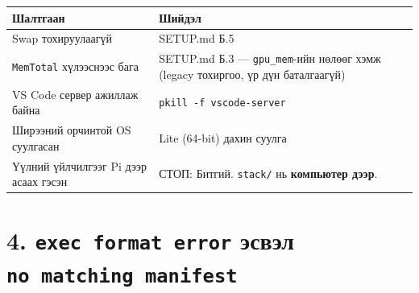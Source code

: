 \begingroup\scriptsize\begin{longtable}[]{@{}ll@{}}
\toprule
\begin{minipage}[b]{0.47\columnwidth}\raggedright
Шалтгаан\strut
\end{minipage} & \begin{minipage}[b]{0.47\columnwidth}\raggedright
Шийдэл\strut
\end{minipage}\tabularnewline
\midrule
\endhead
\begin{minipage}[t]{0.47\columnwidth}\raggedright
Swap тохируулаагүй\strut
\end{minipage} & \begin{minipage}[t]{0.47\columnwidth}\raggedright
SETUP.md Б.5\strut
\end{minipage}\tabularnewline
\begin{minipage}[t]{0.47\columnwidth}\raggedright
\texttt{MemTotal} хүлээснээс бага\strut
\end{minipage} & \begin{minipage}[t]{0.47\columnwidth}\raggedright
SETUP.md Б.3 --- \texttt{gpu\_mem}-ийн нөлөөг хэмж (legacy тохиргоо, үр дүн баталгаагүй)\strut
\end{minipage}\tabularnewline
\begin{minipage}[t]{0.47\columnwidth}\raggedright
VS Code сервер ажиллаж байна\strut
\end{minipage} & \begin{minipage}[t]{0.47\columnwidth}\raggedright
\texttt{pkill\ -f\ vscode-server}\strut
\end{minipage}\tabularnewline
\begin{minipage}[t]{0.47\columnwidth}\raggedright
Ширээний орчинтой OS суулгасан\strut
\end{minipage} & \begin{minipage}[t]{0.47\columnwidth}\raggedright
Lite (64-bit) дахин суулга\strut
\end{minipage}\tabularnewline
\begin{minipage}[t]{0.47\columnwidth}\raggedright
Үүлний үйлчилгээг Pi дээр асаах гэсэн\strut
\end{minipage} & \begin{minipage}[t]{0.47\columnwidth}\raggedright
СТОП: Битгий. \texttt{stack/} нь \textbf{компьютер дээр}.\strut
\end{minipage}\tabularnewline
\bottomrule
\end{longtable}\endgroup

\hypertarget{exec-format-error-ux44dux441ux432ux44dux43b-no-matching-manifest}{%
\section{\texorpdfstring{4. \texttt{exec\ format\ error} эсвэл \texttt{no\ matching\ manifest}}{4. exec format error эсвэл no matching manifest}}\label{exec-format-error-ux44dux441ux432ux44dux43b-no-matching-manifest}}

